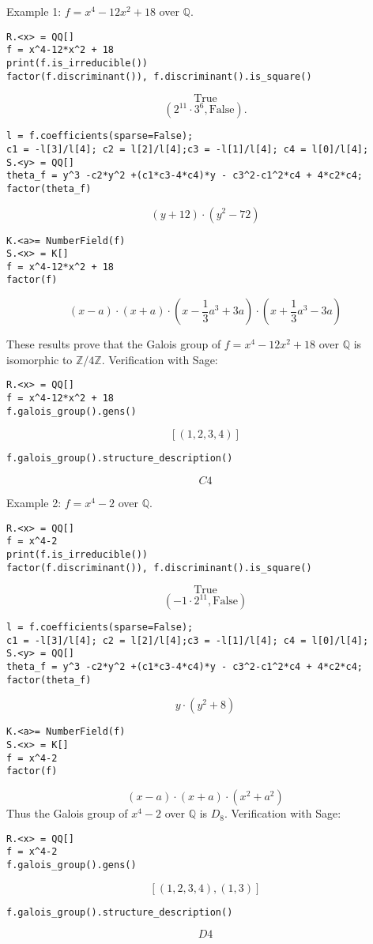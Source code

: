 \documentclass[11pt,a4paper]{article}
\newcommand{\Q}{\mathbb{Q}}
\newcommand{\Z}{\mathbb{Z}}
\begin{document}
Example 1: $f = x^4-12x^2+18$ over $\Q$.
\begin{verbatim}
R.<x> = QQ[]
f = x^4-12*x^2 + 18
print(f.is_irreducible())
factor(f.discriminant()), f.discriminant().is_square()
\end{verbatim}
$$\text{True}$$
$$(2^{11} \cdot 3^6, \text{False}).$$
\begin{verbatim}
l = f.coefficients(sparse=False);
c1 = -l[3]/l[4]; c2 = l[2]/l[4];c3 = -l[1]/l[4]; c4 = l[0]/l[4];
S.<y> = QQ[]
theta_f = y^3 -c2*y^2 +(c1*c3-4*c4)*y - c3^2-c1^2*c4 + 4*c2*c4;
factor(theta_f)
\end{verbatim}
$$(y + 12) \cdot (y^{2} - 72)$$
\begin{verbatim}
K.<a>= NumberField(f)
S.<x> = K[]
f = x^4-12*x^2 + 18
factor(f)
\end{verbatim}
$$(x - a) \cdot (x + a) \cdot (x - \frac{1}{3} a^{3} + 3 a) \cdot (x + \frac{1}{3} a^{3} - 3 a)$$

These results prove that the Galois group of  $f = x^4-12x^2+18$ over $\Q$ is isomorphic to $\Z/4\Z$.
Verification with Sage:
\begin{verbatim}
R.<x> = QQ[]
f = x^4-12*x^2 + 18
f.galois_group().gens()
\end{verbatim}
$$ [(1,2,3,4)]$$
\begin{verbatim}
f.galois_group().structure_description()
\end{verbatim}
$$C4$$
\bigskip

Example 2: $f = x^4 - 2$ over $\Q$.
\begin{verbatim}
R.<x> = QQ[]
f = x^4-2
print(f.is_irreducible())
factor(f.discriminant()), f.discriminant().is_square()
\end{verbatim}
$$\text{True}$$
$$(-1\cdot 2^{11}, \text{False})$$
\begin{verbatim}
l = f.coefficients(sparse=False);
c1 = -l[3]/l[4]; c2 = l[2]/l[4];c3 = -l[1]/l[4]; c4 = l[0]/l[4];
S.<y> = QQ[]
theta_f = y^3 -c2*y^2 +(c1*c3-4*c4)*y - c3^2-c1^2*c4 + 4*c2*c4;
factor(theta_f)
\end{verbatim}
$$y \cdot (y^{2} + 8)$$
\begin{verbatim}
K.<a>= NumberField(f)
S.<x> = K[]
f = x^4-2
factor(f)
\end{verbatim}
$$(x - a) \cdot (x + a) \cdot (x^{2} + a^{2})$$
Thus the Galois group of $x^4 - 2$ over $\Q$ is $D_8$.
Verification with Sage:
\begin{verbatim}
R.<x> = QQ[]
f = x^4-2
f.galois_group().gens()
\end{verbatim}
$$ [(1,2,3,4), (1,3)]$$
\begin{verbatim}
f.galois_group().structure_description()
\end{verbatim}
$$D4$$
\bigskip
\end{document}
